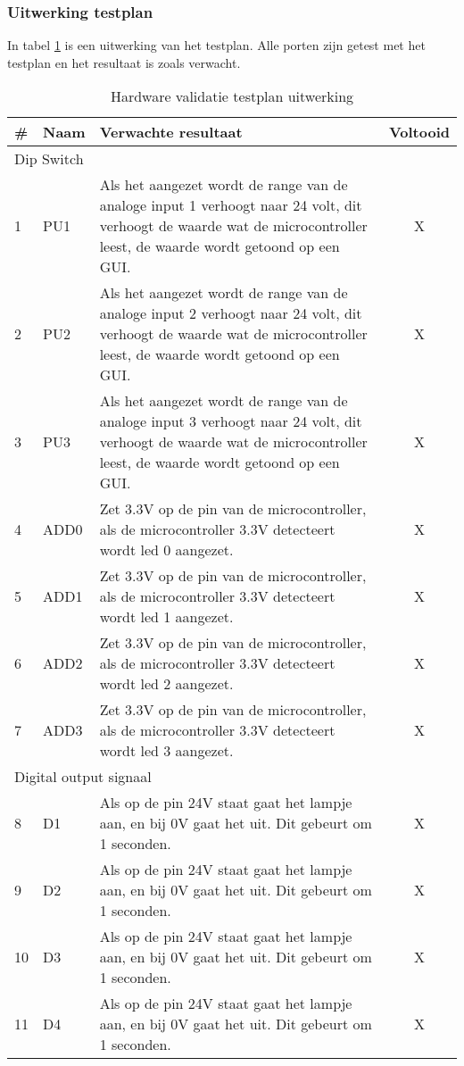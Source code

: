 \subsubsection{Uitwerking testplan}
In tabel \ref{tab:hw_val_dip_testplan} is een uitwerking van het testplan. Alle porten zijn getest met het testplan en het resultaat is zoals verwacht.
\begin{table}[h!]
	\caption{Hardware validatie testplan uitwerking}
	\begin{tabular}{llp{12.25cm}c}
	\toprule
	\textbf{\#}	& \textbf{Naam} & \textbf{Verwachte resultaat} & \textbf{Voltooid}\\ \toprule
	\multicolumn{4}{l}{Dip Switch}   \\ \midrule
	1			& PU1			& Als het aangezet wordt de range van de analoge input 1 verhoogt naar 24 volt, dit verhoogt de waarde wat de microcontroller leest, de waarde wordt getoond op een GUI.	& X \\
	2			& PU2			& Als het aangezet wordt de range van de analoge input 2 verhoogt naar 24 volt, dit verhoogt de waarde wat de microcontroller leest, de waarde wordt getoond op een GUI.	& X \\
	3			& PU3			& Als het aangezet wordt de range van de analoge input 3 verhoogt  naar 24 volt, dit verhoogt de waarde wat de microcontroller leest, de waarde wordt getoond op een GUI.	& X \\
	4			& ADD0 			& Zet 3.3V op de pin van de microcontroller, als de microcontroller 3.3V detecteert wordt led 0 aangezet. & X \\
	5			& ADD1 			& Zet 3.3V op de pin van de microcontroller, als de microcontroller 3.3V detecteert wordt led 1 aangezet. & X \\
	6			& ADD2 			& Zet 3.3V op de pin van de microcontroller, als de microcontroller 3.3V detecteert wordt led 2 aangezet. & X \\
	7			& ADD3 			& Zet 3.3V op de pin van de microcontroller, als de microcontroller 3.3V detecteert wordt led 3 aangezet. & X \\ \midrule
	\multicolumn{4}{l}{Digital output signaal} \\ \midrule 
	8			& D1			&	Als op de pin 24V staat gaat het lampje aan, en bij 0V gaat het uit. Dit gebeurt om 1 seconden. & X \\
	9			& D2			&	Als op de pin 24V staat gaat het lampje aan, en bij 0V gaat het uit. Dit gebeurt om 1 seconden. & X \\
	10			& D3			&	Als op de pin 24V staat gaat het lampje aan, en bij 0V gaat het uit. Dit gebeurt om 1 seconden. & X \\
	11			& D4			&	Als op de pin 24V staat gaat het lampje aan, en bij 0V gaat het uit. Dit gebeurt om 1 seconden. & X \\ \bottomrule
	
	\end{tabular}
	\label{tab:hw_val_dip_testplan}
\end{table}
